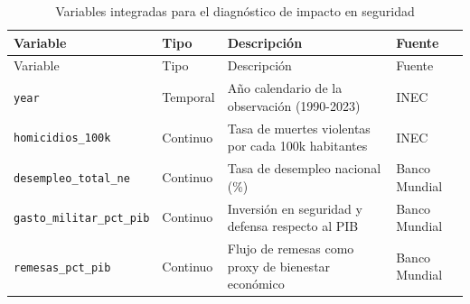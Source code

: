 \documentclass[12pt,spanish]{article}
\begin{document}
\begin{longtable}[]{@{}
  >{\raggedright\arraybackslash}p{}
  >{\raggedright\arraybackslash}p{}
  >{\raggedright\arraybackslash}p{}
  >{\raggedright\arraybackslash}p{}@{}}
\caption{Variables integradas para el diagnóstico de impacto en
seguridad}\label{tbl-vars-homicidios}\tabularnewline
\toprule\noalign{}
\begin{minipage}[b]{\linewidth}\raggedright
Variable
\end{minipage} & \begin{minipage}[b]{\linewidth}\raggedright
Tipo
\end{minipage} & \begin{minipage}[b]{\linewidth}\raggedright
Descripción
\end{minipage} & \begin{minipage}[b]{\linewidth}\raggedright
Fuente
\end{minipage} \\
\midrule\noalign{}
\endfirsthead
\toprule\noalign{}
\begin{minipage}[b]{\linewidth}\raggedright
Variable
\end{minipage} & \begin{minipage}[b]{\linewidth}\raggedright
Tipo
\end{minipage} & \begin{minipage}[b]{\linewidth}\raggedright
Descripción
\end{minipage} & \begin{minipage}[b]{\linewidth}\raggedright
Fuente
\end{minipage} \\
\midrule\noalign{}
\endhead
\bottomrule\noalign{}
\endlastfoot
\texttt{year} & Temporal & Año calendario de la observación (1990-2023)
& INEC \\
\texttt{homicidios\_100k} & Continuo & Tasa de muertes violentas por
cada 100k habitantes & INEC \\
\texttt{desempleo\_total\_ne} & Continuo & Tasa de desempleo nacional
(\%) & Banco Mundial \\
\texttt{gasto\_militar\_pct\_pib} & Continuo & Inversión en seguridad y
defensa respecto al PIB & Banco Mundial \\
\texttt{remesas\_pct\_pib} & Continuo & Flujo de remesas como proxy de
bienestar económico & Banco Mundial \\
\end{longtable}
\end{document}
